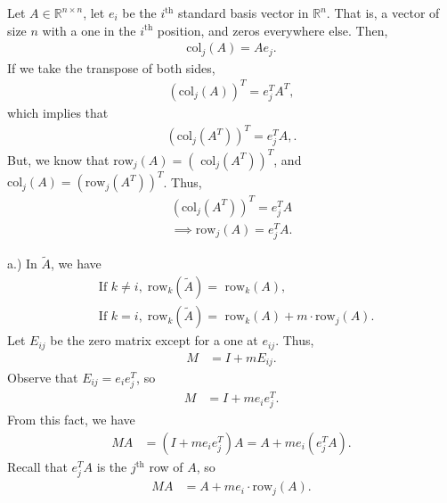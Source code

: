 \documentclass{report}
\begin{document}
    \bigbreak \noindent 
    \begin{remark}
     Let $A \in \mathbb{R}^{n\times n}$, let $e_{i}$ be the $i^{\text{th}}$ standard basis vector in $\mathbb{R}^{n}$. That is, a vector of size $n$ with a one in the $i^{\text{th}}$ position, and zeros everywhere else. Then,
    \begin{align*}
        \text{col}_{j}(A) = Ae_{j}
    .\end{align*}
    \bigbreak \noindent 
    If we take the transpose of both sides,
    \begin{align*}
        \left(\text{col}_{j}(A)\right)^{T} = e_{j}^{T}A^{T},
    \end{align*}
    which implies that
    \begin{align*}
        \left(\text{col}_{j}(A^{T})\right)^{T} = e_{j}^{T}A,
    .\end{align*}
    But, we know that $\text{row}_{j}(A) = (\text{ col}_{j}(A^{T}))^{T} $, and $\text{col}_{j}(A) = (\text{row}_{j}(A^{T}))^{T} $. Thus,
    \begin{align*}
        \left(\text{col}_{j}(A^{T})\right)^{T} = e_{j}^{T}A \\
        \implies \text{row}_{j}(A) = e_{j}^{T}A
    .\end{align*}
    \end{remark} 
    \bigbreak \noindent 
    a.) In $\tilde{A}$, we have
    \begin{align*}
        &\text{If } k \ne i,\; \text{row}_{k}(\tilde{A}) = \text{ row}_{k}(A), \\ 
        &\text{If } k = i,\; \text{row}_{k}(\tilde{A}) = \text{ row}_{k}(A) + m\cdot \text{row}_{j}(A)
    .\end{align*}
    \bigbreak \noindent 
    Let $E_{ij}$ be the zero matrix except for a one at $e_{ij}$. Thus, 
    \begin{align*}
        M &= I + mE_{ij}
    .\end{align*}
    Observe that $E_{ij} = e_{i}e_{j}^{T}$, so
    \begin{align*}
        M &= I + me_{i}e_{j}^{T}
    .\end{align*}
    From this fact, we have
    \begin{align*}
        MA &= (I + me_{i}e_{j}^{T})A = A + me_{i}(e_{j}^{T}A)
    .\end{align*}
    Recall that $e_{j}^{T}A$ is the $j^{\text{th}} $ row of $A$, so
    \begin{align*}
        MA &= A + me_{i} \cdot  \text{row}_{j}(A)
    .\end{align*}
\end{document}
